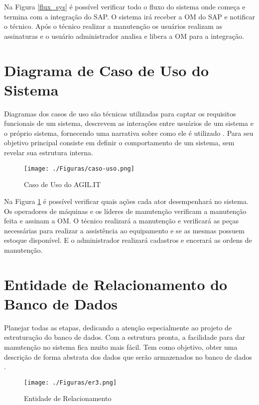 {{Na Figura \ref{flux_sys} é possível verificar todo o fluxo do sistema onde começa e termina com a integração do SAP.
O sistema irá receber a OM do SAP e notificar o técnico. Após o técnico realizar a manutenção os usuários realizam as assinaturas e o usuário administrador analisa e libera a OM para a integração.


\section{Diagrama de Caso de Uso do Sistema }

{Diagramas dos casos de uso são técnicas utilizadas para captar os requisitos funcionais de um sistema, descrevem as interações entre usuários de um sistema e o próprio sistema, fornecendo uma narrativa sobre como ele é utilizado \cite{umlessencial2005}. Para \cite{carniello2003} seu objetivo principal consiste em definir o comportamento de um sistema, sem revelar sua estrutura interna.}

\newpage
\begin{figure}[htb]
	\caption{\label{caso_uso}Caso de Uso do AGIL.IT}
	\begin{center}
		\texttt{[image: ./Figuras/caso-uso.png]}
	\end{center}
\end{figure}

Na Figura \ref{caso_uso} é possível verificar quais ações cada ator desempenhará no sistema.
Os operadores de máquinas e os líderes de manutenção verificam a manutenção feita e assinam a OM. O técnico realizará a manutenção e verificará as peças necessárias para realizar a assistência ao equipamento e se as mesmas possuem estoque disponível. E o administrador realizará cadastros e encerará as ordens de manutenção.


\section{Entidade de Relacionamento do Banco de Dados}

{Planejar todas as etapas, dedicando a atenção especialmente ao projeto de estruturação do banco de dados. Com a estrutura pronta, a facilidade para dar manutenção no sistema fica muito mais fácil.
Tem como objetivo, obter uma descrição de forma abstrata dos dados que serão armazenados no banco de dados \cite{2010_erbd}. }


\newpage
\begin{figure}[htb]
	\caption{\label{entidade_relacionamento}Entidade de Relacionamento}
	\begin{center}
		\texttt{[image: ./Figuras/er3.png]}
	\end{center}
\end{figure}

}}
